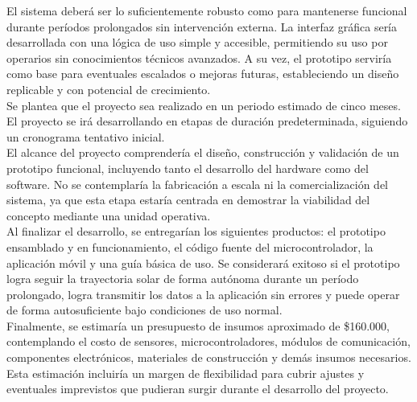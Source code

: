 \documentclass[a4paper,12pt]{article}
\begin{document}
El sistema deberá ser lo suficientemente robusto como para mantenerse funcional durante períodos prolongados sin intervención externa. La interfaz gráfica sería desarrollada con una lógica de uso simple y accesible, permitiendo su uso por operarios sin conocimientos técnicos avanzados. A su vez, el prototipo serviría como base para eventuales escalados o mejoras futuras, estableciendo un diseño replicable y con potencial de crecimiento.\\

Se plantea que el proyecto sea realizado en un periodo estimado de cinco meses. El proyecto se irá desarrollando en etapas de duración predeterminada, siguiendo un cronograma tentativo inicial.\\

El alcance del proyecto comprendería el diseño, construcción y validación de un prototipo funcional, incluyendo tanto el desarrollo del hardware como del software. No se contemplaría la fabricación a escala ni la comercialización del sistema, ya que esta etapa estaría centrada en demostrar la viabilidad del concepto mediante una unidad operativa.\\

Al finalizar el desarrollo, se entregarían los siguientes productos: el prototipo ensamblado y en funcionamiento, el código fuente del microcontrolador, la aplicación móvil y una guía básica de uso.
Se considerará exitoso si el prototipo logra seguir la trayectoria solar de forma autónoma durante un período prolongado, logra transmitir los datos a la aplicación sin errores y puede operar de forma autosuficiente bajo condiciones de uso normal.\\

Finalmente, se estimaría un presupuesto de insumos aproximado de \$160.000, contemplando el costo de sensores, microcontroladores, módulos de comunicación, componentes electrónicos, materiales de construcción y demás insumos necesarios. Esta estimación incluiría un margen de flexibilidad para cubrir ajustes y eventuales imprevistos que pudieran surgir durante el desarrollo del proyecto.\\
\end{document}
